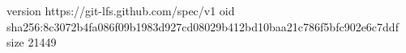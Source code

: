 version https://git-lfs.github.com/spec/v1
oid sha256:8c3072b4fa086f09b1983d927cd08029b412bd10baa21c786f5bfc902e6c7ddf
size 21449
